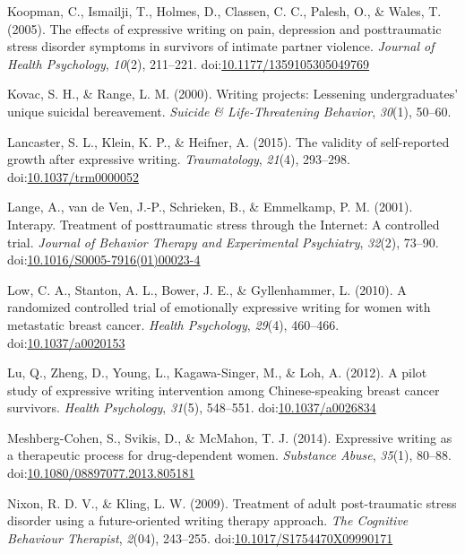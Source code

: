 \documentclass[english,man]{apa6}
\theoremstyle{definition}
\theoremstyle{definition}
\theoremstyle{definition}
\theoremstyle{remark}
\begin{document}
\hypertarget{ref-Koopman2005}{}
Koopman, C., Ismailji, T., Holmes, D., Classen, C. C., Palesh, O., \&
Wales, T. (2005). The effects of expressive writing on pain, depression
and posttraumatic stress disorder symptoms in survivors of intimate
partner violence. \emph{Journal of Health Psychology}, \emph{10}(2),
211--221.
doi:\href{https://doi.org/10.1177/1359105305049769}{10.1177/1359105305049769}

\hypertarget{ref-Kovac2000}{}
Kovac, S. H., \& Range, L. M. (2000). Writing projects: Lessening
undergraduates' unique suicidal bereavement. \emph{Suicide \&
Life-Threatening Behavior}, \emph{30}(1), 50--60.

\hypertarget{ref-Lancaster2015}{}
Lancaster, S. L., Klein, K. P., \& Heifner, A. (2015). The validity of
self-reported growth after expressive writing. \emph{Traumatology},
\emph{21}(4), 293--298.
doi:\href{https://doi.org/10.1037/trm0000052}{10.1037/trm0000052}

\hypertarget{ref-Lange2001}{}
Lange, A., van de Ven, J.-P., Schrieken, B., \& Emmelkamp, P. M. (2001).
Interapy. Treatment of posttraumatic stress through the Internet: A
controlled trial. \emph{Journal of Behavior Therapy and Experimental
Psychiatry}, \emph{32}(2), 73--90.
doi:\href{https://doi.org/10.1016/S0005-7916(01)00023-4}{10.1016/S0005-7916(01)00023-4}

\hypertarget{ref-Low2010}{}
Low, C. A., Stanton, A. L., Bower, J. E., \& Gyllenhammer, L. (2010). A
randomized controlled trial of emotionally expressive writing for women
with metastatic breast cancer. \emph{Health Psychology}, \emph{29}(4),
460--466. doi:\href{https://doi.org/10.1037/a0020153}{10.1037/a0020153}

\hypertarget{ref-Lu2012a}{}
Lu, Q., Zheng, D., Young, L., Kagawa-Singer, M., \& Loh, A. (2012). A
pilot study of expressive writing intervention among Chinese-speaking
breast cancer survivors. \emph{Health Psychology}, \emph{31}(5),
548--551. doi:\href{https://doi.org/10.1037/a0026834}{10.1037/a0026834}

\hypertarget{ref-Meshberg-Cohen2014}{}
Meshberg-Cohen, S., Svikis, D., \& McMahon, T. J. (2014). Expressive
writing as a therapeutic process for drug-dependent women.
\emph{Substance Abuse}, \emph{35}(1), 80--88.
doi:\href{https://doi.org/10.1080/08897077.2013.805181}{10.1080/08897077.2013.805181}

\hypertarget{ref-Nixon2009}{}
Nixon, R. D. V., \& Kling, L. W. (2009). Treatment of adult
post-traumatic stress disorder using a future-oriented writing therapy
approach. \emph{The Cognitive Behaviour Therapist}, \emph{2}(04),
243--255.
doi:\href{https://doi.org/10.1017/S1754470X09990171}{10.1017/S1754470X09990171}
\end{document}
